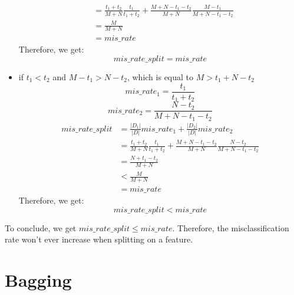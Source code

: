 \documentclass[paper=a4, fontsize=11pt]{scrartcl} %
\numberwithin{equation}{section} %
\numberwithin{figure}{section} %
\numberwithin{table}{section} %
\begin{document}
\begin{itemize}
\begin{align*}
		\\ &=\frac{t_{1}+t_{2}}{M+N}\frac{t_{1}}{t_{1}+t_{2}}+\frac{M+N-t_{1}-t_{2}}{M+N}\frac{M-t_{1}}{M+N-t_{1}-t_{2}}
		\\ &=\frac{M}{M+N}
		\\ &=mis\_rate
		\end{align*}
		Therefore, we get:
		\begin{equation*}
		mis\_rate\_split=mis\_rate
		\end{equation*}
	\item if $t_{1}<t_{2}$ and $M-t_{1}>N-t_{2}$, which is equal to $M>t_{1}+N-t_{2}$
		\begin{equation*}
		mis\_rate_{1}=\frac{t_{1}}{t_{1}+t_{2}}
		\end{equation*}
		\begin{equation*}
		mis\_rate_{2}=\frac{N-t_{2}}{M+N-t_{1}-t_{2}}
		\end{equation*}
		\begin{align*}
		mis\_rate\_split&=\frac{\left | D_{1} \right |}{\left | D \right |}mis\_rate_{1}+\frac{\left | D_{2} \right |}{\left | D \right |}mis\_rate_{2}
		\\ &=\frac{t_{1}+t_{2}}{M+N}\frac{t_{1}}{t_{1}+t_{2}}+\frac{M+N-t_{1}-t_{2}}{M+N}\frac{N-t_{2}}{M+N-t_{1}-t_{2}}
		\\ &=\frac{N+t_{1}-t_{2}}{M+N}
		\\ &<\frac{M}{M+N}
		\\ &=mis\_rate
		\end{align*}
		Therefore, we get:
		\begin{equation*}
		mis\_rate\_split<mis\_rate
		\end{equation*}
\end{itemize}
To conclude, we get $mis\_rate\_split\leq mis\_rate$. Therefore, the misclassification rate won't ever increase when splitting on a feature. 

\section{Bagging}
\end{document}
